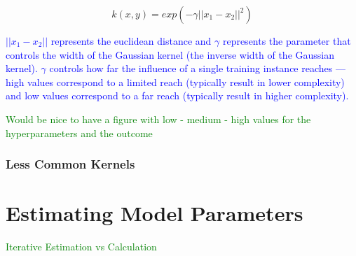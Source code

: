 \begin{equation}
{k(x, y) = exp(- \gamma || x_1 - x_2 || ^2 ) }
\label{eq:kernel_guassian_rbf_eq}
\end{equation}

\textcolor{blue}{$|| x_1 - x_2 ||$ represents the euclidean distance and $\gamma$ represents the parameter that controls the width of the Gaussian kernel (the inverse width of the Gaussian kernel). $\gamma$ controls how far the influence of a single training instance reaches --- high values correspond to a limited reach (typically result in lower complexity) and low values correspond to a far reach (typically result in higher complexity).}

\textcolor{green}{Would be nice to have a figure with low - medium - high values for the hyperparameters and the outcome}


\subsection{Less Common Kernels}










\chapter{Estimating Model Parameters}

\textcolor{green}{Iterative Estimation vs Calculation}

